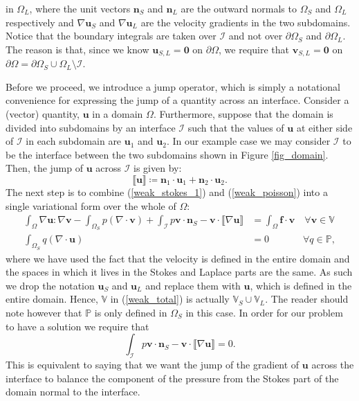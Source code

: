 \documentclass[12pt,a4paper]{article}
\theoremstyle{definition}
\begin{document}
in $\Omega_L$, where the unit vectors $\textbf{n}_S$ and $\textbf{n}_L$ are the outward normals to $\Omega_{S}$ and $\Omega_{L}$ respectively and $\nabla \textbf{u}_S$ and $\nabla \textbf{u}_L$ are the velocity gradients in the two subdomains. Notice that the boundary integrals are taken over $\mathcal{I}$ and not over $\partial \Omega_{S}$ and $\partial \Omega_{L}$.  The reason is that, since we know $\textbf{u}_{S,L}=\textbf{0}$ on $\partial \Omega$, we require that $\textbf{v}_{S,L}=\textbf{0}$ on $ \partial \Omega = \partial \Omega_S\cup \Omega_{L}\setminus \mathcal{I}$.   

Before we proceed, we introduce a jump operator, which is simply a notational convenience for expressing the jump of a quantity across an interface.  Consider a (vector) quantity, $\textbf{u}$ in a domain $\Omega$.   Furthermore, suppose that the domain is divided into subdomains by an interface $\mathcal{I}$ such that the values of $\textbf{u}$ at either side of $\mathcal{I}$ in each subdomain are $\textbf{u}_1$ and $\textbf{u}_2$. In our example case we may consider $\mathcal{I}$ to be the interface between the two subdomains shown in Figure \ref{fig_domain}.  Then, the jump of $\textbf{u}$ across $\mathcal{I}$ is given by:
\begin{equation}
\llbracket \textbf{u} \rrbracket \coloneqq \textbf{n}_1\cdot \textbf{u}_1+\textbf{n}_2\cdot  \textbf{u}_2.
\end{equation}
The next step is to combine (\ref{weak_stokes_1}) and (\ref{weak_poisson}) into a single variational form over the whole of $\Omega$:
\begin{equation}\label{weak_total}
\begin{aligned}
\int_{\Omega}\nabla \textbf{u} : \nabla \textbf{v}-\int_{\Omega_S}p\left(\nabla \cdot \textbf{v}\right) +\int_{\mathcal{I}} p\textbf{v}\cdot \textbf{n}_S-\textbf{v}\cdot\llbracket\nabla\textbf{u}\rrbracket &=\int_{\Omega}\textbf{f}\cdot \textbf{v} \quad \forall  \textbf{v}\in \mathbb{V}\\
\int_{\Omega_S}q\left(\nabla \cdot \textbf{u}\right) &= 0\quad\quad\,\,\,\quad \forall q\in \mathbb{P},
\end{aligned}
\end{equation}
where we have used the fact that the velocity is defined in the entire domain and the spaces in which it lives in the Stokes and Laplace parts are the same.  As such we drop the notation $\textbf{u}_S$ and $\textbf{u}_L$ and replace them with $\textbf{u}$, which is defined in the entire domain.  Hence, $\mathbb{V}$ in (\ref{weak_total}) is actually $\mathbb{V}_S\cup\mathbb{V}_L$.  The reader should note however that $\mathbb{P}$ is only defined in $\Omega_S$ in this case.
In order for our problem to have a solution we require that 
\begin{equation}\label{combi_cond_wellpos}
\int_{\mathcal{I}} p\textbf{v}\cdot \textbf{n}_S-\textbf{v}\cdot\llbracket\nabla\textbf{u}\rrbracket=0.
\end{equation}
This is equivalent to saying that we want the jump of the gradient of $\textbf{u}$ across the interface to balance the component of the pressure from the Stokes part of the domain normal to the interface.
\end{document}
